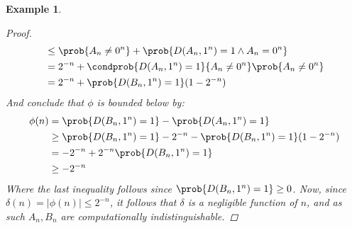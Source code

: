 \documentclass{article}
\newtheorem{example}{Example}
\begin{document}
\begin{example}
\begin{proof}
\begin{align*}
             & \leq \prob{A_n \neq 0^n} + \prob{D(A_n, 1^n) = 1 \land A_n = 0^n}                    \\
             & = 2^{-n} + \condprob{D(A_n, 1^n) = 1}{A_n \neq 0^n} \prob{A_n \neq 0^n}              \\
             & = 2^{-n} + \prob{D(B_n, 1^n) = 1} (1 - 2^{-n})
        \end{align*}
        And conclude that $\phi$ is bounded below by:
        \begin{align*}
            \phi(n) & =  \prob{D(B_n, 1^n) = 1} - \prob{D(A_n, 1^n) = 1}                          \\
                    & \geq  \prob{D(B_n, 1^n) = 1} - 2^{-n} - \prob{D(B_n, 1^n) = 1} (1 - 2^{-n}) \\
                    & =  - 2 ^ {-n} + 2^{-n} \prob{D(B_n, 1^n) = 1}                               \\
                    & \geq - 2^{-n}
        \end{align*}
        Where the last inequality follows since $\prob{D(B_n, 1^n) = 1} \geq 0$.
        Now, since $\delta(n) = |\phi(n)| \leq  2 ^ {-n} $, it follows that $\delta$ is a negligible function of $n$, and as such $A_n, B_n$ are computationally indistinguishable.

    \end{proof}
\end{example}
\end{document}

